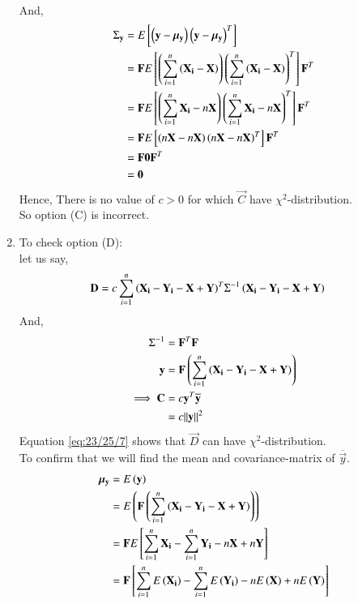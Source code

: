 \documentclass[journal,12pt,onecolumn]{IEEEtran}
\theoremstyle{remark}
\begin{document}
\begin{enumerate}[label=(\alph*)]
\begin{align}
\end{align}
And,
\begin{align}
{\Sigma}_{\mathbf{y}} &= E{}\left[\left(\mathbf{y}-{\bm{\mu}}_{\mathbf{y}}\right){\left(\mathbf{y}-{\bm{\mu}}_{\mathbf{y}}\right)}^T\right] \\
                   &= \mathbf{F}E{}\left[\left(\sum_{i=1}^{n}\left(\mathbf{X_i}-\mathbf{X}\right)\right){\left(\sum_{i=1}^{n}\left(\mathbf{X_i}-\mathbf{X}\right)\right)}^T\right]{\mathbf{F}}^T \\
                   &= \mathbf{F}E{}\left[\left(\sum_{i=1}^{n}\mathbf{X_i}-n\mathbf{X}\right){\left(\sum_{i=1}^{n}\mathbf{X_i}-n\mathbf{X}\right)}^T\right]{\mathbf{F}}^T \\
                   &= \mathbf{F}E{}\left[\left(n\mathbf{X}-n\mathbf{X}\right){\left(n\mathbf{X}-n\mathbf{X}\right)}^T\right]{\mathbf{F}}^T \\
                   &= \mathbf{F}\bm{0}{\mathbf{F}}^T  \\
                   &= \bm{0} 
\end{align}
Hence, There is no value of $c>0$ for which $\vec{C}$ have ${\chi}^2$-distribution.\\
So option (C) is incorrect.
\item To check option (D): \\
let us say,
\begin{align}
\mathbf{D} &= c\sum_{i=1}^n{\left(\mathbf{X_i}-\mathbf{Y_i}-\mathbf{X}+\mathbf{Y}\right)}^T{\Sigma}^{-1}\left(\mathbf{X_i}-\mathbf{Y_i}-\mathbf{X}+\mathbf{Y}\right)
\end{align}
And,
\begin{align}
{\Sigma}^{-1} &= {\mathbf{F}}^T\mathbf{F}  \\
\mathbf{y} &= \mathbf{F}\left(\sum_{i=1}^{n}\left(\mathbf{X_i}-\mathbf{Y_i}-\mathbf{X}+\mathbf{Y}\right)\right) \\
\implies \mathbf{C} &= c{\mathbf{y}}^T\overline{\mathbf{y}} \\
                 &= c{\left\lVert\mathbf{y}\right\rVert}^2  \label{eq:23/25/7}
\end{align}
Equation \eqref{eq:23/25/7} shows that $\vec{D}$ can have ${\chi}^2$-distribution. \\
To confirm that we will find the mean and covariance-matrix of $\overline{\vec{y}}$.
\begin{align}
{\bm{\mu}}_{\vec{y}} &= E\brak{\vec{y}} \\
                     &= E\brak{\vec{F}\brak{\sum_{i=1}^{n}\brak{\vec{X_i}-\vec{Y_i}-\vec{X}+\vec{Y}}}} \\
                     &= \vec{F}E\sbrak{\sum_{i=1}^{n}\vec{X_i}-\sum_{i=1}^{n}\vec{Y_i}-n\vec{X}+n\vec{Y}} \\
                     &= \vec{F}\sbrak{\sum_{i=1}^{n}E\brak{\vec{X_i}}-\sum_{i=1}^{n}E\brak{\vec{Y_i}}-nE\brak{\vec{X}}+nE\brak{\vec{Y}}} \\

\end{align}
\end{enumerate}
\end{document}
